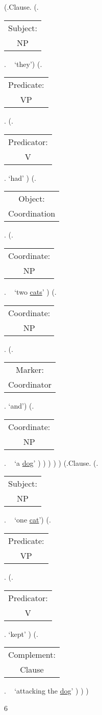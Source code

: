 \documentclass[12pt,letterpaper]{article}
\begin{document}
	\begin{figure}
	\begin{center}
		\begin{parsetree}
			(.Clause.
			(.\begin{tabular}{c}Subject:\\NP\end{tabular}.  ~ `they')
			(.\begin{tabular}{c}Predicate:\\VP\end{tabular}.
			(.\begin{tabular}{c}Predicator:\\V\end{tabular}. `had' )
			(.\begin{tabular}{c}Object:\\Coordination\end{tabular}.
			(.\begin{tabular}{c}Coordinate:\\NP\end{tabular}. ~ `two \underline{cats}' )
			(.\begin{tabular}{c}Coordinate:\\NP\end{tabular}.
			(.\begin{tabular}{c}Marker:\\Coordinator\end{tabular}. `and')
			(.\begin{tabular}{c}Coordinate:\\NP\end{tabular}. ~ `a \underline{dog}' )
			)
			)
			)
			)
						(.Clause.
			(.\begin{tabular}{c}Subject:\\NP\end{tabular}.  ~ `one \underline{cat}')
			(.\begin{tabular}{c}Predicate:\\VP\end{tabular}.
			(.\begin{tabular}{c}Predicator:\\V\end{tabular}. `kept' )
			(.\begin{tabular}{c}Complement:\\Clause\end{tabular}. ~ `attacking the \underline{dog}' )
			)
			)
			
			\hfill \break\hfill \break
		\end{parsetree}
		6
	\end{center}
\end{figure}
\end{document}
